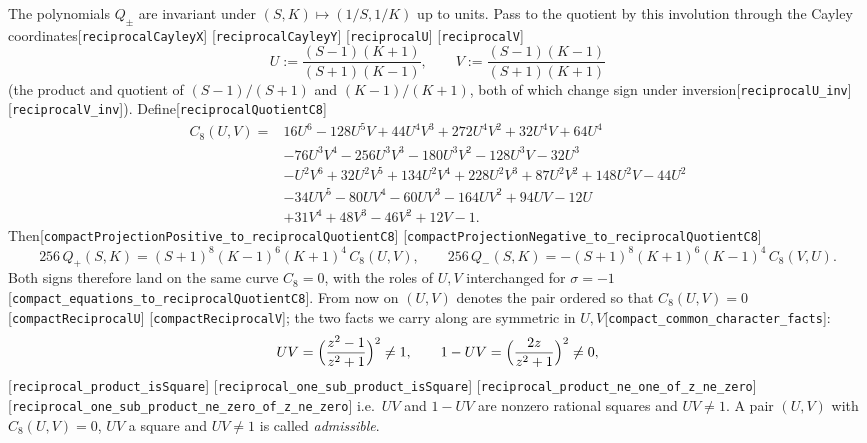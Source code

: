 \documentclass[10pt]{article}
\theoremstyle{definition}
\theoremstyle{remark}
\newcommand{\leanref}[1]{{\scriptsize\textup{[\texttt{#1}]}}\allowbreak}
\begin{document}
The polynomials $Q_\pm$ are invariant under $(S,K)\mapsto(1/S,1/K)$ up to
units.  Pass to the quotient by this involution through the Cayley
coordinates\leanref{reciprocal\allowbreak Cayley\allowbreak X} \leanref{reciprocal\allowbreak Cayley\allowbreak Y} \leanref{reciprocal\allowbreak U} \leanref{reciprocal\allowbreak V}
\[
 U:=\frac{(S-1)(K+1)}{(S+1)(K-1)},\qquad V:=\frac{(S-1)(K-1)}{(S+1)(K+1)}
\]
(the product and quotient of $(S-1)/(S+1)$ and $(K-1)/(K+1)$, both of which change
sign under inversion\leanref{reciprocal\allowbreak U\_\allowbreak inv} \leanref{reciprocal\allowbreak V\_\allowbreak inv}).
Define\leanref{reciprocal\allowbreak Quotient\allowbreak C8}
\begin{equation}\label{eq:C8}
\begin{aligned}
C_8(U,V)={}&16U^6-128U^5V+44U^4V^3+272U^4V^2+32U^4V+64U^4\\
&-76U^3V^4-256U^3V^3-180U^3V^2-128U^3V-32U^3\\
&-U^2V^6+32U^2V^5+134U^2V^4+228U^2V^3+87U^2V^2+148U^2V-44U^2\\
&-34UV^5-80UV^4-60UV^3-164UV^2+94UV-12U\\
&+31V^4+48V^3-46V^2+12V-1 .
\end{aligned}
\end{equation}
Then\leanref{compact\allowbreak Projection\allowbreak Positive\_\allowbreak to\_\allowbreak reciprocal\allowbreak Quotient\allowbreak C8} \leanref{compact\allowbreak Projection\allowbreak Negative\_\allowbreak to\_\allowbreak reciprocal\allowbreak Quotient\allowbreak C8}
\[
 256\,Q_+(S,K)=(S+1)^8(K-1)^6(K+1)^4\,C_8(U,V),\qquad
 256\,Q_-(S,K)=-(S+1)^8(K+1)^6(K-1)^4\,C_8(V,U).
\]
Both signs therefore land on the same curve $C_8=0$, with the roles of $U,V$
interchanged for $\sigma=-1$\leanref{compact\_\allowbreak equations\_\allowbreak to\_\allowbreak reciprocal\allowbreak Quotient\allowbreak C8}.
From now on $(U,V)$ denotes the pair ordered so that $C_8(U,V)=0$
\leanref{compact\allowbreak Reciprocal\allowbreak U} \leanref{compact\allowbreak Reciprocal\allowbreak V}; the two facts we
carry along are symmetric in $U,V$\leanref{compact\_\allowbreak common\_\allowbreak character\_\allowbreak facts}:
\begin{equation}\label{eq:characters}
 UV=\Bigl(\frac{z^2-1}{z^2+1}\Bigr)^2\ne1,\qquad
 1-UV=\Bigl(\frac{2z}{z^2+1}\Bigr)^2\ne0 ,
\end{equation}
\leanref{reciprocal\_\allowbreak product\_\allowbreak is\allowbreak Square} \leanref{reciprocal\_\allowbreak one\_\allowbreak sub\_\allowbreak product\_\allowbreak is\allowbreak Square} \leanref{reciprocal\_\allowbreak product\_\allowbreak ne\_\allowbreak one\_\allowbreak of\_\allowbreak z\_\allowbreak ne\_\allowbreak zero} \leanref{reciprocal\_\allowbreak one\_\allowbreak sub\_\allowbreak product\_\allowbreak ne\_\allowbreak zero\_\allowbreak of\_\allowbreak z\_\allowbreak ne\_\allowbreak zero}
i.e.\ $UV$ and $1-UV$ are nonzero rational squares and $UV\ne1$.  A pair
$(U,V)$ with $C_8(U,V)=0$, $UV$ a square and $UV\ne1$ is called
\emph{admissible}.
\end{document}

